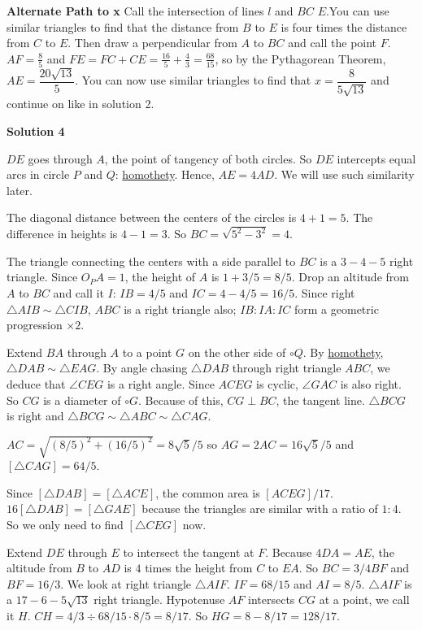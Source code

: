 \begin{enumerate}
 \textbf{Alternate Path to x} Call the intersection of lines $l$ and $BC$ $E$.You can use similar triangles to find that the distance from $B$ to $E$ is four times the distance from $C$ to $E$. Then draw a perpendicular from $A$ to $BC$ and call the point $F$. $AF = \frac{8}{5}$ and $FE = FC + CE = \frac{16}{5} + \frac{4}{3} = \frac{68}{15}$, so by the Pythagorean Theorem, $AE = \dfrac{20\sqrt{13}}{5}$. You can now use similar triangles to find that $x =  \dfrac{8}{5\sqrt{13}}$ and continue on like in solution 2.

 



\textbf{Solution 4}

$DE$ goes through $A$, the point of tangency of both circles. So $DE$ intercepts equal arcs in circle $P$ and $Q$:  \href{https://artofproblemsolving.com/wiki/index.php?title=Homothety}{homothety}. Hence, $AE=4AD$. We will use such similarity later.

 The diagonal distance between the centers of the circles is $4+1=5$. The difference in heights is $4-1=3$. So $BC=\sqrt{5^2-3^2}=4$.

 The triangle connecting the centers with a side parallel to $BC$  is a $3-4-5$ right triangle. Since $O_PA=1$, the height of $A$ is $1+3/5=8/5$. Drop an altitude from $A$ to $BC$ and call it $I$: $IB=4/5$ and $IC=4-4/5=16/5$. Since right $\triangle AIB\sim\triangle CIB$, $ABC$ is a right triangle also; $IB:IA:IC$ form a geometric progression $\times 2$.

 
Extend $BA$ through $A$ to a point $G$ on the other side of $\circ Q$. By \href{https://artofproblemsolving.com/wiki/index.php?title=Homothety}{homothety}, $\triangle DAB\sim\triangle EAG$. By angle chasing $\triangle DAB$ through right triangle $ABC$, we deduce that $\angle CEG$ is a right angle. Since $ACEG$ is cyclic, $\angle GAC$ is also right. So $CG$ is a diameter of $\circ G$. Because of this, $CG \perp BC$, the tangent line. $\triangle BCG$ is right and $\triangle BCG\sim\triangle ABC\sim\triangle CAG$.

 
$AC=\sqrt{(8/5)^2+(16/5)^2}=8\sqrt{5}/5$ so $AG=2AC=16\sqrt{5}/5$ and $[\triangle CAG]=64/5$. 

 Since $[\triangle DAB]=[\triangle ACE]$, the common area is $[ACEG]/17$. $16[\triangle DAB]=[\triangle GAE]$ because the triangles are similar with a ratio of $1:4$. So we only need to find $[\triangle CEG]$ now.

 
Extend $DE$ through $E$ to intersect the tangent at $F$. Because $4DA=AE$, the altitude from $B$ to $AD$ is $4$ times the height from $C$ to $EA$. So $BC=3/4BF$ and $BF=16/3$. We look at right triangle $\triangle AIF$. $IF=68/15$ and $AI=8/5$. $\triangle AIF$ is a $17-6-5\sqrt{13}$ right triangle. Hypotenuse $AF$ intersects $CG$ at a point, we call it $H$. $CH=4/3\div 68/15\cdot 8/5=8/17$. So $HG=8-8/17=128/17$.


\end{enumerate}
